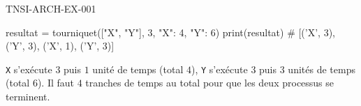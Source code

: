 \begin{corrige}{TNSI-ARCH-EX-001}
\begin{python}
resultat = tourniquet(["X", "Y"], 3, {"X": 4, "Y": 6})
print(resultat)  # [('X', 3), ('Y', 3), ('X', 1), ('Y', 3)]
\end{python}
\texttt{X} s'exécute $3$ puis $1$ unité de temps (total $4$), \texttt{Y} s'exécute $3$ puis $3$ unités de temps (total $6$). Il faut $4$ tranches de temps au total pour que les deux processus se terminent.
\end{corrige}
